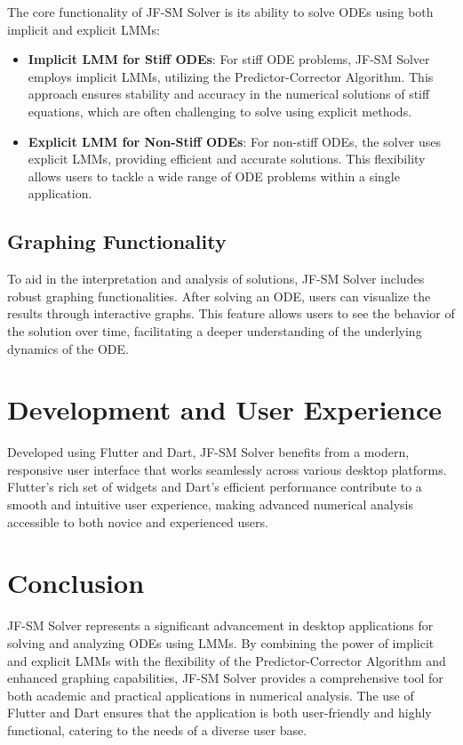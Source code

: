 The core functionality of JF-SM Solver is its ability to solve ODEs using both implicit and explicit LMMs:

\begin{itemize}
  \item \textbf{Implicit LMM for Stiff ODEs}: For stiff ODE problems, JF-SM Solver employs implicit LMMs, utilizing the Predictor-Corrector Algorithm. This approach ensures stability and accuracy in the numerical solutions of stiff equations, which are often challenging to solve using explicit methods.
  
  \item \textbf{Explicit LMM for Non-Stiff ODEs}: For non-stiff ODEs, the solver uses explicit LMMs, providing efficient and accurate solutions. This flexibility allows users to tackle a wide range of ODE problems within a single application.
\end{itemize}

\subsection{Graphing Functionality}

To aid in the interpretation and analysis of solutions, JF-SM Solver includes robust graphing functionalities. After solving an ODE, users can visualize the results through interactive graphs. This feature allows users to see the behavior of the solution over time, facilitating a deeper understanding of the underlying dynamics of the ODE.

\section{Development and User Experience}

Developed using Flutter and Dart, JF-SM Solver benefits from a modern, responsive user interface that works seamlessly across various desktop platforms. Flutter’s rich set of widgets and Dart’s efficient performance contribute to a smooth and intuitive user experience, making advanced numerical analysis accessible to both novice and experienced users.

\section{Conclusion}

JF-SM Solver represents a significant advancement in desktop applications for solving and analyzing ODEs using LMMs. By combining the power of implicit and explicit LMMs with the flexibility of the Predictor-Corrector Algorithm and enhanced graphing capabilities, JF-SM Solver provides a comprehensive tool for both academic and practical applications in numerical analysis. The use of Flutter and Dart ensures that the application is both user-friendly and highly functional, catering to the needs of a diverse user base.

